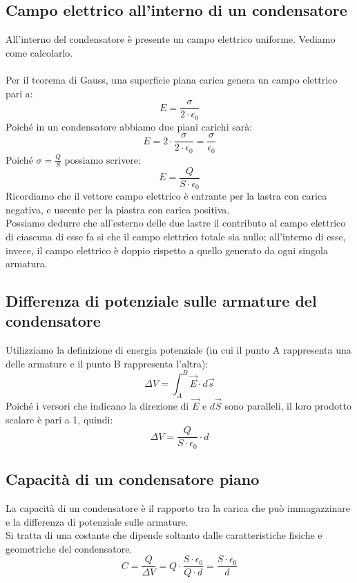 \subsection{Campo elettrico all'interno di un condensatore}
All'interno del condensatore è presente un campo elettrico uniforme. Vediamo come calcolarlo.\\\\
Per il teorema di Gauss, una superficie piana carica genera un campo elettrico pari a:
\begin{displaymath}
	E = \frac{\sigma}{2 \cdot \epsilon_0}
\end{displaymath}
Poiché in un condensatore abbiamo due piani carichi sarà:
\begin{displaymath}
	E = 2 \cdot \frac{\sigma}{2 \cdot \epsilon_0} = \frac{\sigma}{\epsilon_0}
\end{displaymath}
Poiché $\sigma = \frac{Q}{S}$ possiamo scrivere:
\begin{displaymath}
	E = \frac{Q}{S \cdot \epsilon_0}
\end{displaymath}
Ricordiamo che il vettore campo elettrico è entrante per la lastra con carica negativa, e uscente per la piastra con carica positiva.\\
Possiamo dedurre che all’esterno delle due lastre il contributo al campo elettrico di ciascuna di esse fa si che il campo elettrico totale sia nullo; all’interno di esse, invece, il campo elettrico è doppio rispetto a quello generato da ogni singola armatura.

\subsection{Differenza di potenziale sulle armature del condensatore}
Utilizziamo la definizione di energia potenziale (in cui il punto A rappresenta una delle armature e il punto B rappresenta l'altra):
\begin{displaymath}
	\Delta V = \int_A^B \vec{E} \cdot d\vec{s}
\end{displaymath}
Poiché i versori che indicano la direzione di $\vec{E}$ e $d\vec{S}$ sono paralleli, il loro prodotto scalare è pari a 1, quindi:
\begin{displaymath}
	\Delta V = \frac{Q}{S \cdot \epsilon_0} \cdot d
\end{displaymath}

\subsection{Capacità di un condensatore piano}
La capacità di un condensatore è il rapporto tra la carica che può immagazzinare e la differenza di potenziale sulle armature.\\
Si tratta di una costante che dipende soltanto dalle caratteristiche fisiche e geometriche del condensatore.
\begin{displaymath}
	C = \frac{Q}{\Delta V} = Q \cdot \frac{S \cdot \epsilon_0}{Q \cdot d} = \frac{S \cdot \epsilon_0}{d} 
\end{displaymath}

